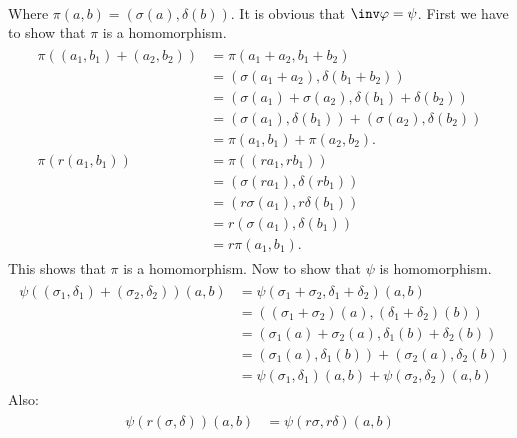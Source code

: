 \begin{enumerate}[label=]
\begin{gather*}
        \end{gather*}
        Where $\pi(a, b) = (\sigma(a), \delta(b))$. It is obvious that $\inv \varphi = \psi$. First we have to show that $\pi$ is a homomorphism.
        \begin{gather*}
            \begin{split}
                \pi((a_1, b_1) + (a_2, b_2)) & = \pi(a_1 + a_2, b_1 + b_2) \\
                & = (\sigma(a_1 + a_2), \delta(b_1 + b_2)) \\
                & = (\sigma(a_1) + \sigma(a_2), \delta(b_1) + \delta(b_2)) \\
                & = (\sigma(a_1), \delta(b_1)) + (\sigma(a_2), \delta(b_2)) \\
                & = \pi(a_1, b_1) + \pi(a_2, b_2). \\
                \pi(r(a_1, b_1)) & = \pi((ra_1, rb_1)) \\
                & = (\sigma(ra_1), \delta(rb_1)) \\
                & = (r\sigma(a_1), r\delta(b_1)) \\
                & = r(\sigma(a_1), \delta(b_1)) \\
                & = r \pi(a_1, b_1).
            \end{split}
        \end{gather*}
        This shows that $\pi$ is a homomorphism. Now to show that $\psi$ is homomorphism.
        \begin{gather*}
            \begin{split}
                \psi((\sigma_1, \delta_1) + (\sigma_2, \delta_2))(a, b) &= \psi(\sigma_1 + \sigma_2, \delta_1 + \delta_2)(a, b) \\
                & = ((\sigma_1 + \sigma_2)(a) , (\delta_1 + \delta_2)(b)) \\
                & = (\sigma_1(a) + \sigma_2(a), \delta_1(b) + \delta_2(b)) \\
                & = (\sigma_1(a), \delta_1(b)) + (\sigma_2(a), \delta_2(b)) \\
                & = \psi(\sigma_1, \delta_1)(a, b) + \psi(\sigma_2, \delta_2)(a, b)
            \end{split}
        \end{gather*}
        Also:
        \begin{gather*}
            \begin{split}
                \psi(r(\sigma, \delta))(a, b) & = \psi(r\sigma, r\delta)(a, b) \\

\end{split}
\end{gather*}
\end{enumerate}
